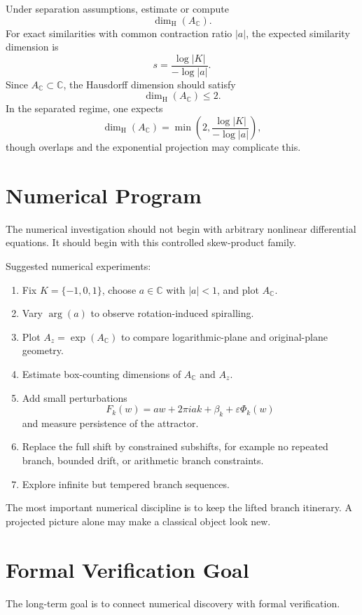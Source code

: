 \documentclass[12pt]{article}
\newcommand{\C}{\mathbb{C}}
\newcommand{\dimH}{\dim_{\mathrm H}}
\begin{document}
	Under separation assumptions, estimate or compute
	\[
	\dimH(A_{\C}).
	\]
	For exact similarities with common contraction ratio \(|a|\), the expected similarity dimension is
	\[
	s=\frac{\log |K|}{-\log |a|}.
	\]
	Since \(A_{\C}\subset\C\), the Hausdorff dimension should satisfy
	\[
	\dimH(A_{\C})\leq 2.
	\]
	In the separated regime, one expects
	\[
	\dimH(A_{\C})=\min\left(2,\frac{\log |K|}{-\log |a|}\right),
	\]
	though overlaps and the exponential projection may complicate this.
	
	\section{Numerical Program}
	
	The numerical investigation should not begin with arbitrary nonlinear differential equations. It should begin with this controlled skew-product family.
	
	Suggested numerical experiments:
	
	\begin{enumerate}
		\item Fix \(K=\{-1,0,1\}\), choose \(a\in\C\) with \(|a|<1\), and plot \(A_{\C}\).
		\item Vary \(\arg(a)\) to observe rotation-induced spiralling.
		\item Plot \(A_z=\exp(A_{\C})\) to compare logarithmic-plane and original-plane geometry.
		\item Estimate box-counting dimensions of \(A_{\C}\) and \(A_z\).
		\item Add small perturbations
		\[
		F_k(w)=a w+2\pi i a k+\beta_k+\varepsilon\Phi_k(w)
		\]
		and measure persistence of the attractor.
		\item Replace the full shift by constrained subshifts, for example no repeated branch, bounded drift, or arithmetic branch constraints.
		\item Explore infinite but tempered branch sequences.
	\end{enumerate}
	
	The most important numerical discipline is to keep the lifted branch itinerary. A projected picture alone may make a classical object look new.
	
	\section{Formal Verification Goal}
	
	The long-term goal is to connect numerical discovery with formal verification.
	
\end{document}
